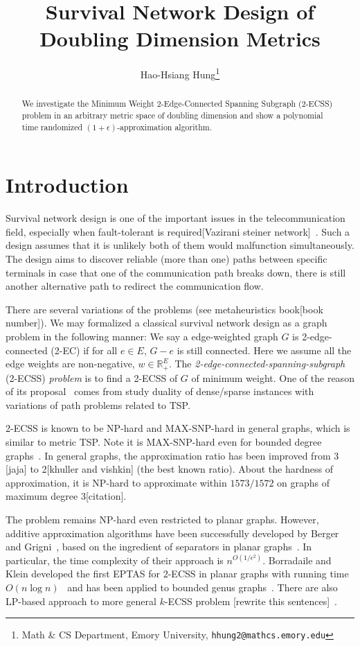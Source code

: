 \documentclass{llncs}
\title{Survival Network Design of Doubling Dimension Metrics}
\author{Hao-Hsiang Hung\thanks{Math \& CS Department,
        Emory University, {\tt hhung2@mathcs.emory.edu}}
}
\institute{Emory University}
\begin{document}
\thispagestyle{empty}
\maketitle

\begin{abstract}
We investigate the Minimum Weight 2-Edge-Connected Spanning Subgraph (2-ECSS) problem in an arbitrary metric space of doubling dimension and show a polynomial time randomized $(1+\epsilon)$-approximation algorithm.

\end{abstract}

\section{Introduction}
Survival network design is one of the important issues in the telecommunication field, especially when fault-tolerant is required[Vazirani steiner network]~\cite{Guptasurvey}.
Such a design assumes that it is unlikely both of them would malfunction simultaneously.
The design aims to discover reliable (more than one) paths between specific terminals in case that one of the communication path breaks down, there is still another alternative path to redirect the communication flow.

There are several variations of the problems (see metaheuristics book[book number]).
We may formalized a classical survival network design as a graph problem in the following manner:
We say a edge-weighted graph $G$ is 2-edge-connected (2-EC) if for all $e\in E$, $G-e$ is still connected.
Here we assume all the edge weights are non-negative, $w\in{\mathbb{R}}_{+}^{E}$.
The \emph{2-edge-connected-spanning-subgraph} (2-ECSS) \emph{problem} is to find a 2-ECSS of $G$ of minimum weight.
One of the reason of its proposal~\cite{Csaba02} comes from study duality of dense/sparse instances with variations of path problems related to TSP.

2-ECSS is known to be NP-hard and MAX-SNP-hard in general graphs, which is similar to metric TSP.
Note it is MAX-SNP-hard even for bounded degree graphs~\cite{Grigni07}.
In general graphs, the approximation ratio has been improved from 3 [jaja] to 2[khuller and vishkin] (the best known ratio).
About the hardness of approximation, it is NP-hard to approximate within $1573/1572$ on graphs of maximum degree 3[citation].

The problem remains NP-hard even restricted to planar graphs.
However, additive approximation algorithms have been successfully developed by Berger and Grigni~\cite{Grigni05,Grigni07}, based on the ingredient of separators in planar graphs~\cite{Grigni00}.
In particular, the time complexity of their approach is $n^{O(1/{\epsilon}^2)}$.
Borradaile and Klein developed the first EPTAS for 2-ECSS in planar graphs with running time $O(n\log n)$~\cite{Borradaile08} and has been applied to bounded genus graphs~\cite{Borradaile09}.
There are also LP-based approach to more general $k$-ECSS problem [rewrite this sentences]~\cite{Pritchard10}.
\end{document}
